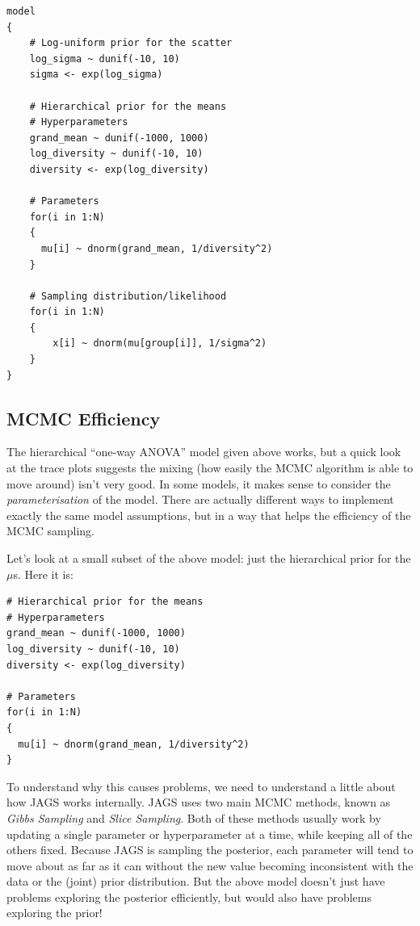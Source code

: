 \begin{verbatim}
model
{
    # Log-uniform prior for the scatter
    log_sigma ~ dunif(-10, 10)
    sigma <- exp(log_sigma)

    # Hierarchical prior for the means
    # Hyperparameters
    grand_mean ~ dunif(-1000, 1000)
    log_diversity ~ dunif(-10, 10)
    diversity <- exp(log_diversity)

    # Parameters
    for(i in 1:N)
    {
      mu[i] ~ dnorm(grand_mean, 1/diversity^2)
    }

    # Sampling distribution/likelihood
    for(i in 1:N)
    {
        x[i] ~ dnorm(mu[group[i]], 1/sigma^2)
    }
}
\end{verbatim}


\subsection{MCMC Efficiency}
The hierarchical ``one-way ANOVA'' model given above works, but a quick look
at the trace plots suggests the mixing (how easily the MCMC algorithm is
able to move around) isn't very good. In some models, it makes sense to
consider the {\it parameterisation} of the model. There are actually different
ways to implement exactly the same model assumptions, but in a way that helps
the efficiency of the MCMC sampling.

Let's look at a small subset of the above model: just the hierarchical prior
for the $\mu$s. Here it is:

\begin{verbatim}
# Hierarchical prior for the means
# Hyperparameters
grand_mean ~ dunif(-1000, 1000)
log_diversity ~ dunif(-10, 10)
diversity <- exp(log_diversity)

# Parameters
for(i in 1:N)
{
  mu[i] ~ dnorm(grand_mean, 1/diversity^2)
}
\end{verbatim}

To understand why this causes problems, we need to understand a little about
how JAGS works internally. JAGS uses two main MCMC methods, known as
{\it Gibbs Sampling} and {\it Slice Sampling}. Both of these methods usually
work by updating a single parameter or hyperparameter at a time, while keeping
all of the others fixed. Because JAGS is sampling the posterior, each
parameter will tend to move about as far as it can without the new value
becoming inconsistent with the data or the (joint) prior distribution. But
the above model doesn't just have problems exploring the posterior efficiently,
but would also have problems exploring the prior!


